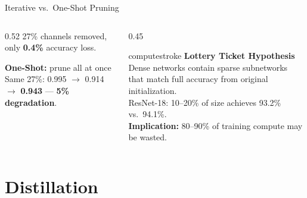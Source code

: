 \documentclass[aspectratio=169, 12pt]{beamer}
\begin{document}
\begin{frame}{Iterative vs.\ One-Shot Pruning}
\begin{columns}[T]
\begin{column}{0.52\textwidth}
    \vspace{0.05cm}
    27\% channels removed, only \textbf{0.4\%} accuracy loss.

    \vspace{0.1cm}
    \textbf{One-Shot:} prune all at once\\
    {\scriptsize Same 27\%: 0.995 $\to$ 0.914 $\to$ \textbf{0.943} --- \textcolor{errorstroke}{\textbf{5\% degradation}}.}
  \end{column}
  \begin{column}{0.45\textwidth}
    \begin{mlsyscard}{computestroke}
    {\scriptsize \textbf{Lottery Ticket Hypothesis}\\[0.05cm]
    Dense networks contain sparse subnetworks that match full accuracy from original initialization.\\[0.05cm]
    ResNet-18: 10--20\% of size achieves 93.2\% vs.\ 94.1\%.\\[0.05cm]
    \textcolor{computestroke}{\textbf{Implication:}} 80--90\% of training compute may be wasted.}
    \end{mlsyscard}
  \end{column}
\end{columns}

\end{frame}

\section{Distillation}
\end{document}
